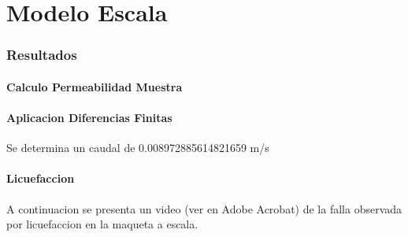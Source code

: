 \part{Modelo Escala}

\section{Resultados}

\subsection{Calculo Permeabilidad Muestra}

\subsection{Aplicacion Diferencias Finitas}

Se determina un caudal de 0.008972885614821659 m/s

\subsection{Licuefaccion}

A continuacion se presenta un video (ver en Adobe Acrobat) de la falla observada por licuefaccion en la maqueta a escala.

